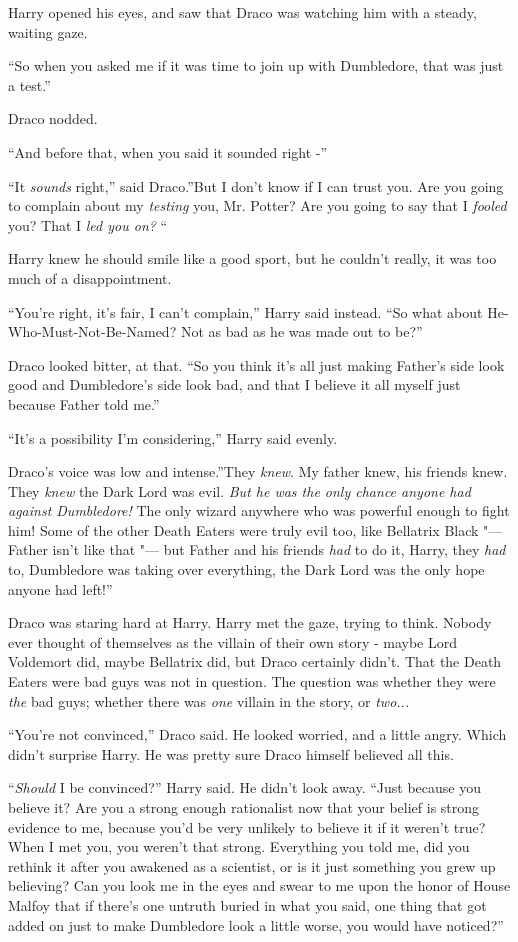 Harry opened his eyes, and saw that Draco was watching him with a
steady, waiting gaze.

``So when you asked me if it was time to join up with Dumbledore, that
was just a test.''

Draco nodded.

``And before that, when you said it sounded right -''

``It \emph{sounds} right,'' said Draco.''But I don't know if I can trust
you. Are you going to complain about my \emph{testing} you, Mr. Potter?
Are you going to say that I \emph{fooled} you? That I \emph{led you on?}
``

Harry knew he should smile like a good sport, but he couldn't really, it
was too much of a disappointment.

``You're right, it's fair, I can't complain,'' Harry said instead. ``So
what about He-Who-Must-Not-Be-Named? Not as bad as he was made out to
be?''

Draco looked bitter, at that. ``So you think it's all just making
Father's side look good and Dumbledore's side look bad, and that I
believe it all myself just because Father told me.''

``It's a possibility I'm considering,'' Harry said evenly.

Draco's voice was low and intense.''They \emph{knew}. My father knew,
his friends knew. They \emph{knew} the Dark Lord was evil. \emph{But he
was the only chance anyone had against Dumbledore!} The only wizard
anywhere who was powerful enough to fight him! Some of the other Death
Eaters were truly evil too, like Bellatrix Black "--- Father isn't like
that "--- but Father and his friends \emph{had} to do it, Harry, they
\emph{had} to, Dumbledore was taking over everything, the Dark Lord was
the only hope anyone had left!''

Draco was staring hard at Harry. Harry met the gaze, trying to think.
Nobody ever thought of themselves as the villain of their own story -
maybe Lord Voldemort did, maybe Bellatrix did, but Draco certainly
didn't. That the Death Eaters were bad guys was not in question. The
question was whether they were \emph{the} bad guys; whether there was
\emph{one} villain in the story, or \emph{two...}

``You're not convinced,'' Draco said. He looked worried, and a little
angry. Which didn't surprise Harry. He was pretty sure Draco himself
believed all this.

``\emph{Should} I be convinced?'' Harry said. He didn't look away. ``Just
because you believe it? Are you a strong enough rationalist now that
your belief is strong evidence to me, because you'd be very unlikely to
believe it if it weren't true? When I met you, you weren't that strong.
Everything you told me, did you rethink it after you awakened as a
scientist, or is it just something you grew up believing? Can you look
me in the eyes and swear to me upon the honor of House Malfoy that if
there's one untruth buried in what you said, one thing that got added on
just to make Dumbledore look a little worse, you would have noticed?''

